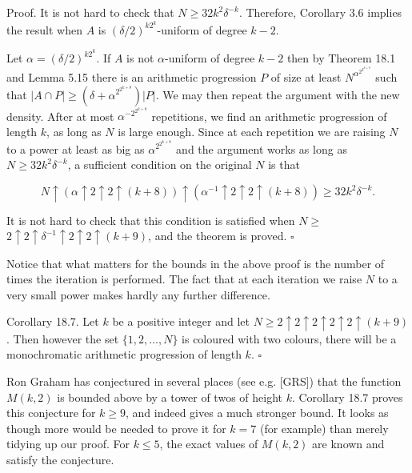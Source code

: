 \documentclass[10pt]{article}
\begin{document}
Proof. It is not hard to check that $N \geqslant 32 k^{2} \delta^{-k}$. Therefore, Corollary 3.6 implies the result when $A$ is $(\delta / 2)^{k 2^{k}}$-uniform of degree $k-2$.

Let $\alpha=(\delta / 2)^{k 2^{k}}$. If $A$ is not $\alpha$-uniform of degree $k-2$ then by Theorem 18.1 and Lemma 5.15 there is an arithmetic progression $P$ of size at least $N^{\alpha^{2^{2^{k+8}}}}$ such that $|A \cap P| \geqslant\left(\delta+\alpha^{2^{2^{k+8}}}\right)|P|$. We may then repeat the argument with the new density. After at most $\alpha^{-2^{2^{k+8}}}$ repetitions, we find an arithmetic progression of length $k$, as long as $N$ is large enough. Since at each repetition we are raising $N$ to a power at least as big as $\alpha^{2^{2^{k+8}}}$ and the argument works as long as $N \geqslant 32 k^{2} \delta^{-k}$, a sufficient condition on the original $N$ is that

$$
N \uparrow(\alpha \uparrow 2 \uparrow 2 \uparrow(k+8)) \uparrow\left(\alpha^{-1} \uparrow 2 \uparrow 2 \uparrow(k+8)\right) \geqslant 32 k^{2} \delta^{-k} .
$$

It is not hard to check that this condition is satisfied when $N \geqslant$ $2 \uparrow 2 \uparrow \delta^{-1} \uparrow 2 \uparrow 2 \uparrow(k+9)$, and the theorem is proved. \(\square\)

Notice that what matters for the bounds in the above proof is the number of times the iteration is performed. The fact that at each iteration we raise $N$ to a very small power makes hardly any further difference.

Corollary 18.7. Let $k$ be a positive integer and let $N \geqslant 2 \uparrow 2 \uparrow 2 \uparrow 2 \uparrow 2 \uparrow (k+9)$. Then however the set $\{1,2, \ldots, N\}$ is coloured with two colours, there will be a monochromatic arithmetic progression of length $k$. \(\square\)

Ron Graham has conjectured in several places (see e.g. [GRS]) that the function $M(k, 2)$ is bounded above by a tower of twos of height $k$. Corollary 18.7 proves this conjecture for $k \geqslant 9$, and indeed gives a much stronger bound. It looks as though more would be needed to prove it for $k=7$ (for example) than merely tidying up our proof. For $k \leqslant 5$, the exact values of $M(k, 2)$ are known and satisfy the conjecture.
\end{document}
